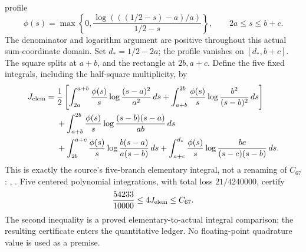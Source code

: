 profile
\[
 \phi(s)=\max\left\{0,\frac{\log(((1/2-s)-a)/a)}{1/2-s}\right\},
 \qquad 2a\le s\le b+c.
\]
The denominator and logarithm argument are positive throughout this
actual sum-coordinate domain.  Set $d_*=1/2-2a$; the profile vanishes
on $[d_*,b+c]$.  The square splits at $a+b$, and the rectangle at $2b,a+c$.
Define the five fixed integrals, including the half-square multiplicity,
by
\begin{align*}
 J_{\rm elem}={}&\frac12\left[
 \int_{2a}^{a+b}\frac{\phi(s)}s\log\frac{(s-a)^2}{a^2}\,ds
 +\int_{a+b}^{2b}\frac{\phi(s)}s\log\frac{b^2}{(s-b)^2}\,ds\right]\\
 &+\int_{a+b}^{2b}\frac{\phi(s)}s\log\frac{(s-b)(s-a)}{ab}\,ds\\
 &+\int_{2b}^{a+c}\frac{\phi(s)}s\log\frac{b(s-a)}{a(s-b)}\,ds
 +\int_{a+c}^{d_*}\frac{\phi(s)}s\log\frac{bc}{(s-c)(s-b)}\,ds.
\end{align*}
This is exactly the source's five-branch elementary integral, not a
renaming of $C_{67}$:
,
.
Five centered polynomial integrations, with total loss $21/4240000$,
certify
\[
 \frac{54233}{10000}\le4J_{\rm elem}\le C_{67}.
\]
The second inequality is a proved elementary-to-actual integral
comparison; the resulting certificate enters the quantitative ledger.
No floating-point quadrature value is used as a premise.

